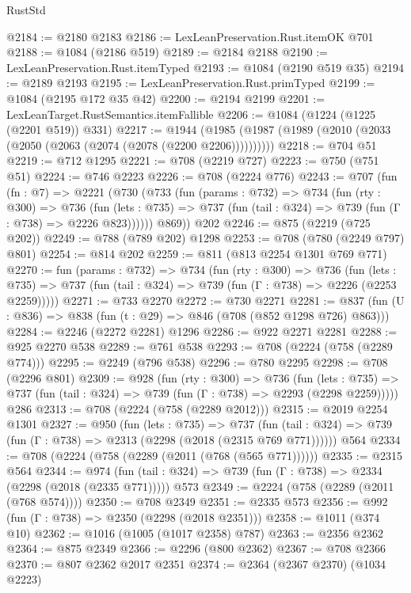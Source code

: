 \begin{lexlean}{RustStd}
\begin{coremodule}
@2184 := @2180 @2183
@2186 := LexLeanPreservation.Rust.itemOK @701
@2188 := @1084 (@2186 @519)
@2189 := @2184 @2188
@2190 := LexLeanPreservation.Rust.itemTyped
@2193 := @1084 (@2190 @519 @35)
@2194 := @2189 @2193
@2195 := LexLeanPreservation.Rust.primTyped
@2199 := @1084 (@2195 @172 @35 @42)
@2200 := @2194 @2199
@2201 := LexLeanTarget.RustSemantics.itemFallible
@2206 := @1084 (@1224 (@1225 (@2201 @519)) @331)
@2217 := @1944 (@1985 (@1987 (@1989 (@2010 (@2033 (@2050 (@2063 (@2074 (@2078 (@2200 @2206))))))))))
@2218 := @704 @51
@2219 := @712 @1295
@2221 := @708 (@2219 @727)
@2223 := @750 (@751 @51)
@2224 := @746 @2223
@2226 := @708 (@2224 @776)
@2243 := @707
    (fun (fn : @7) =>
    @2221
      (@730
        (@733
          (fun (params : @732) =>
          @734
            (fun (rty : @300) =>
            @736
              (fun (lets : @735) =>
              @737 (fun (tail : @324) => @739 (fun (Γ : @738) => @2226 @823))))))
        @869))
    @202
@2246 := @875 (@2219 (@725 @202))
@2249 := @788 (@789 @202) @1298
@2253 := @708 (@780 (@2249 @797) @801)
@2254 := @814 @202
@2259 := @811 (@813 @2254 @1301 @769 @771)
@2270 := fun (params : @732) =>
  @734
    (fun (rty : @300) =>
    @736
      (fun (lets : @735) =>
      @737 (fun (tail : @324) => @739 (fun (Γ : @738) => @2226 (@2253 @2259)))))
@2271 := @733 @2270
@2272 := @730 @2271
@2281 := @837 (fun (U : @836) => @838 (fun (t : @29) => @846 (@708 (@852 @1298 @726) @863)))
@2284 := @2246 (@2272 @2281) @1296
@2286 := @922 @2271 @2281
@2288 := @925 @2270 @538
@2289 := @761 @538
@2293 := @708 (@2224 (@758 (@2289 @774)))
@2295 := @2249 (@796 @538)
@2296 := @780 @2295
@2298 := @708 (@2296 @801)
@2309 := @928
    (fun (rty : @300) =>
    @736
      (fun (lets : @735) =>
      @737 (fun (tail : @324) => @739 (fun (Γ : @738) => @2293 (@2298 @2259)))))
    @286
@2313 := @708 (@2224 (@758 (@2289 @2012)))
@2315 := @2019 @2254 @1301
@2327 := @950
    (fun (lets : @735) =>
    @737 (fun (tail : @324) => @739 (fun (Γ : @738) => @2313 (@2298 (@2018 (@2315 @769 @771))))))
    @564
@2334 := @708 (@2224 (@758 (@2289 (@2011 (@768 (@565 @771))))))
@2335 := @2315 @564
@2344 := @974
    (fun (tail : @324) => @739 (fun (Γ : @738) => @2334 (@2298 (@2018 (@2335 @771)))))
    @573
@2349 := @2224 (@758 (@2289 (@2011 (@768 @574))))
@2350 := @708 @2349
@2351 := @2335 @573
@2356 := @992 (fun (Γ : @738) => @2350 (@2298 (@2018 @2351)))
@2358 := @1011 (@374 @10)
@2362 := @1016 (@1005 (@1017 @2358) @787)
@2363 := @2356 @2362
@2364 := @875 @2349
@2366 := @2296 (@800 @2362)
@2367 := @708 @2366
@2370 := @807 @2362 @2017 @2351
@2374 := @2364 (@2367 @2370) (@1034 @2223)

\end{coremodule}
\end{lexlean}
